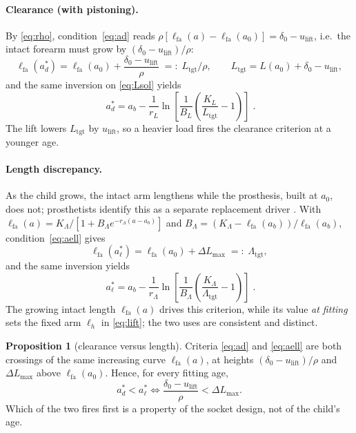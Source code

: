 \documentclass[11pt]{article}
\newcommand{\lift}{u_{\mathrm{lift}}}
\newcommand{\lfa}{\ell_{\mathrm{fa}}}
\newcommand{\tgt}{\mathrm{tgt}}
\theoremstyle{definition}
\newtheorem{proposition}{Proposition}
\begin{document}
\paragraph{Clearance (with pistoning).} By \eqref{eq:rho}, condition~\eqref{eq:ad} reads $\rho[\lfa(a)-\lfa(a_0)]=\delta_0-\lift$, i.e.\ the intact forearm must grow by $(\delta_0-\lift)/\rho$:
\begin{equation}
\lfa(a^*_d)=\lfa(a_0)+\frac{\delta_0-\lift}{\rho}\;=:\;L_\tgt/\rho,
\qquad
L_\tgt=L(a_0)+\delta_0-\lift ,
\label{eq:Ltgt}
\end{equation}
and the same inversion on \eqref{eq:Lsol} yields
\begin{equation}
\boxed{\;a^*_d=a_b-\frac{1}{r_L}\ln\!\left[\frac{1}{B_L}\!\left(\frac{K_L}{L_\tgt}-1\right)\right]\;}.
\label{eq:adsol}
\end{equation}
The lift lowers $L_\tgt$ by $\lift$, so a heavier load fires the clearance criterion at a younger age.

\paragraph{Length discrepancy.} As the child grows, the intact arm lengthens while the prosthesis, built at $a_0$, does not; prosthetists identify this as a separate replacement driver \cite{ghidini2025}. With $\lfa(a)=K_\Lambda/[1+B_\Lambda e^{-r_\Lambda(a-a_b)}]$ and $B_\Lambda=(K_\Lambda-\lfa(a_b))/\lfa(a_b)$, condition~\eqref{eq:aell} gives
\begin{equation}
\lfa(a^*_\ell)=\lfa(a_0)+\Delta L_{\max}\;=:\;\Lambda_\tgt ,
\label{eq:Lamtgt}
\end{equation}
and the same inversion yields
\begin{equation}
\boxed{\;a^*_\ell=a_b-\frac{1}{r_\Lambda}\ln\!\left[\frac{1}{B_\Lambda}\!\left(\frac{K_\Lambda}{\Lambda_\tgt}-1\right)\right]\;}.
\label{eq:aellsol}
\end{equation}
The growing intact length $\lfa(a)$ drives this criterion, while its value \emph{at fitting} sets the fixed arm $\ell_h$ in \eqref{eq:lift}; the two uses are consistent and distinct.

\begin{proposition}[clearance versus length]\label{prop:race}
Criteria \eqref{eq:ad} and \eqref{eq:aell} are both crossings of the same increasing curve $\lfa(a)$, at heights $(\delta_0-\lift)/\rho$ and $\Delta L_{\max}$ above $\lfa(a_0)$. Hence, for every fitting age,
\[
a^*_d<a^*_\ell\iff\frac{\delta_0-\lift}{\rho}<\Delta L_{\max}.
\]
Which of the two fires first is a property of the socket design, not of the child's age.
\end{proposition}
\end{document}
